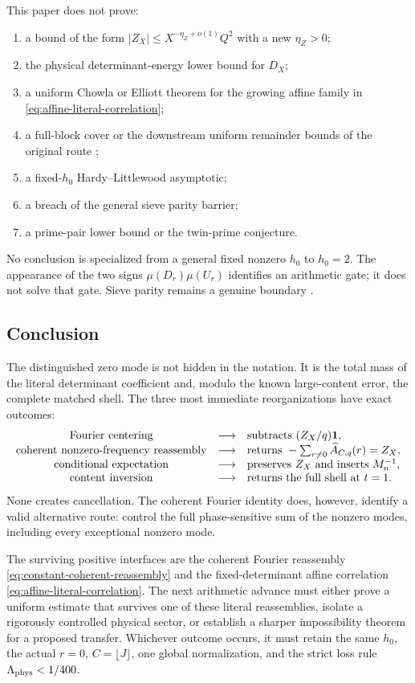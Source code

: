 This paper does not prove:
\begin{enumerate}[label=\textup{(\alph*)},leftmargin=2.3em]
 \item a bound of the form
 \(|Z_X|\le X^{-\eta_Z+o(1)}Q^2\) with a new
 \(\eta_Z>0\);
 \item the physical determinant-energy lower bound for \(D_X\);
 \item a uniform Chowla or Elliott theorem for the growing affine
 family in \eqref{eq:affine-literal-correlation};
 \item a full-block cover or the downstream uniform remainder bounds
 of the original route \citep{WangTPC18};
 \item a fixed-\(h_0\) Hardy--Littlewood asymptotic;
 \item a breach of the general sieve parity barrier;
 \item a prime-pair lower bound or the twin-prime conjecture.
\end{enumerate}
No conclusion is specialized from a general fixed nonzero \(h_0\) to
\(h_0=2\).  The appearance of the two signs
\(\mu(D_r)\mu(U_r)\) identifies an arithmetic gate; it does not solve
that gate.  Sieve parity remains a genuine boundary
\citep{HeathBrown1982Parity,IwaniecKowalski2004}.

\subsection{Conclusion}

The distinguished zero mode is not hidden in the notation.  It is the
total mass of the literal determinant coefficient and, modulo the
known large-content error, the complete matched shell.  The three
most immediate reorganizations have exact outcomes:
\[
\begin{array}{ccl}
\text{Fourier centering}
&\longrightarrow&
\text{subtracts }(Z_X/q)\mathbf 1,\\
\text{coherent nonzero-frequency reassembly}
&\longrightarrow&
\text{returns }-\sum_{r\ne0}\widehat A_{C,q}(r)=Z_X,\\
\text{conditional expectation}
&\longrightarrow&
\text{preserves }Z_X\text{ and inserts }M_n^{-1},\\
\text{content inversion}
&\longrightarrow&
\text{returns the full shell at }t=1.
\end{array}
\]
None creates cancellation.  The coherent Fourier identity does,
however, identify a valid alternative route: control the full
phase-sensitive sum of the nonzero modes, including every exceptional
nonzero mode.

The surviving positive interfaces are the coherent Fourier
reassembly \eqref{eq:constant-coherent-reassembly} and the
fixed-determinant affine correlation
\eqref{eq:affine-literal-correlation}.  The next arithmetic advance
must either prove a uniform estimate that survives one of these
literal reassemblies, isolate a rigorously controlled physical sector,
or establish a sharper impossibility theorem for a proposed transfer.
Whichever outcome occurs, it must retain the same \(h_0\), the actual
\(r=0\), \(C=\lfloor J\rfloor\), one global normalization, and the
strict loss rule \(\Lambda_{\rm phys}<1/400\).
